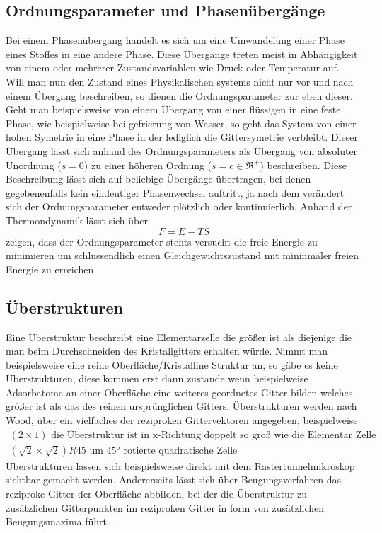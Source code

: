    \subsection{Ordnungsparameter und Phasenübergänge}
       Bei einem Phasenübergang handelt es sich um eine Umwandelung einer Phase eines Stoffes in 
       eine andere Phase. Diese Übergänge treten meist in Abhängigkeit von einem oder mehrerer Zustandsvariablen
       wie Druck oder Temperatur auf.\\
       Will man nun den Zustand eines Physikalischen systems nicht nur vor und nach einem Übergang beschreiben,
       so dienen die Ordnungsparameter zur eben dieser. Geht man beispielsweise von einem Übergang von einer
       flüssigen in eine feste Phase, wie beispielweise bei gefrierung von Wasser, so geht das System von einer
       hohen Symetrie in eine Phase in der lediglich die Gittersymetrie verbleibt. Dieser Übergang lässt sich
       anhand des Ordnungsparameters als Übergang von absoluter Unordnung ($s=0$) zu einer höheren Ordnung
       ($s=c\in \Re^+$) beschreiben. Diese Beschreibung lässt sich auf beliebige Übergänge übertragen, bei denen
       gegebenenfalls kein eindeutiger Phasenwechsel auftritt, ja nach dem verändert sich der Ordnungsparameter
       entweder plötzlich oder kontinuierlich. Anhand der Thermondynamik lässt sich über
       \begin{equation}
           F = E-TS
       \end{equation}
       zeigen, dass der Ordnungsparameter stehts versucht die freie Energie zu minimieren um schlussendlich
       einen Gleichgewichtszustand mit mininmaler freien Energie zu erreichen. 

    \subsection{Überstrukturen}
        Eine Überstruktur beschreibt eine Elementarzelle die größer ist als diejenige die man beim Durchschneiden
        des Kristallgitters erhalten würde. Nimmt man beispielsweise eine reine Oberfläche/Kristalline Struktur an, so
        gäbe es keine Überstrukturen, diese kommen erst dann zustande wenn beispielweise Adsorbatome an einer Oberfläche
        eine weiteres geordnetes Gitter bilden welches größer ist als das des reinen ursprünglichen Gitters.
        Überstrukturen werden nach Wood, über ein vielfaches der reziproken Gittervektoren angegeben, beispielweise
        \begin{align*}
            (2\times1) \text{  die Überstruktur ist in x-Richtung doppelt so groß wie die Elementar Zelle}\\
            (\sqrt{2}\times\sqrt{2})R45 \text{  um 45° rotierte quadratische Zelle}
        \end{align*}
        Überstrukturen lassen sich beispielsweise direkt mit dem Rastertunnelmikroskop sichtbar gemacht werden.
        Andererseits lässt sich über Beugungsverfahren das reziproke Gitter der Oberfläche abbilden, bei der die
        Überstruktur zu zusätzlichen Gitterpunkten im reziproken Gitter in form von zusätzlichen Beugungsmaxima
        führt. 
